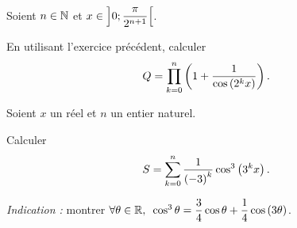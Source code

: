\begin{exo}[Exercice 9]
Soient \(n\in\mathbb{N}\) et \(x\in\left]0;\dfrac{\pi}{2^{n+1}}\right[\).

En utilisant l'exercice précédent, calculer \[Q=\prod_{k=0}^{n}\left(1+\dfrac{1}{\cos\left(2^kx\right)}\right).\]
\end{exo}

\begin{corr}
\end{corr}

\begin{exo}[Exercice 10]
Soient \(x\) un réel et \(n\) un entier naturel.

Calculer \[S=\sum_{k=0}^{n}\dfrac{1}{\left(-3\right)^k}\cos^3\left(3^kx\right).\]

\textit{Indication :} montrer \(\quantifs{\forall\theta\in\R}\cos^3\theta=\dfrac{3}{4}\cos\theta+\dfrac{1}{4}\cos\paren{3\theta}\).
\end{exo}

\begin{corr}
\end{corr}